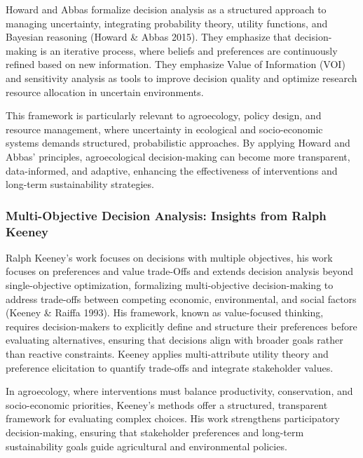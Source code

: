 \documentclass[
]{article}
\begin{document}
Howard and Abbas formalize decision analysis as a structured approach to
managing uncertainty, integrating probability theory, utility functions,
and Bayesian reasoning (Howard \& Abbas 2015). They emphasize that
decision-making is an iterative process, where beliefs and preferences
are continuously refined based on new information. They emphasize Value
of Information (VOI) and sensitivity analysis as tools to improve
decision quality and optimize research resource allocation in uncertain
environments.

This framework is particularly relevant to agroecology, policy design,
and resource management, where uncertainty in ecological and
socio-economic systems demands structured, probabilistic approaches. By
applying Howard and Abbas' principles, agroecological decision-making
can become more transparent, data-informed, and adaptive, enhancing the
effectiveness of interventions and long-term sustainability strategies.

\hypertarget{multi-objective-decision-analysis-insights-from-ralph-keeney}{%
\subsubsection*{Multi-Objective Decision Analysis: Insights from Ralph
Keeney}\label{multi-objective-decision-analysis-insights-from-ralph-keeney}}

Ralph Keeney's work focuses on decisions with multiple objectives, his
work focuses on preferences and value trade-Offs and extends decision
analysis beyond single-objective optimization, formalizing
multi-objective decision-making to address trade-offs between competing
economic, environmental, and social factors (Keeney \& Raiffa 1993). His
framework, known as value-focused thinking, requires decision-makers to
explicitly define and structure their preferences before evaluating
alternatives, ensuring that decisions align with broader goals rather
than reactive constraints. Keeney applies multi-attribute utility theory
and preference elicitation to quantify trade-offs and integrate
stakeholder values.

In agroecology, where interventions must balance productivity,
conservation, and socio-economic priorities, Keeney's methods offer a
structured, transparent framework for evaluating complex choices. His
work strengthens participatory decision-making, ensuring that
stakeholder preferences and long-term sustainability goals guide
agricultural and environmental policies.
\end{document}
